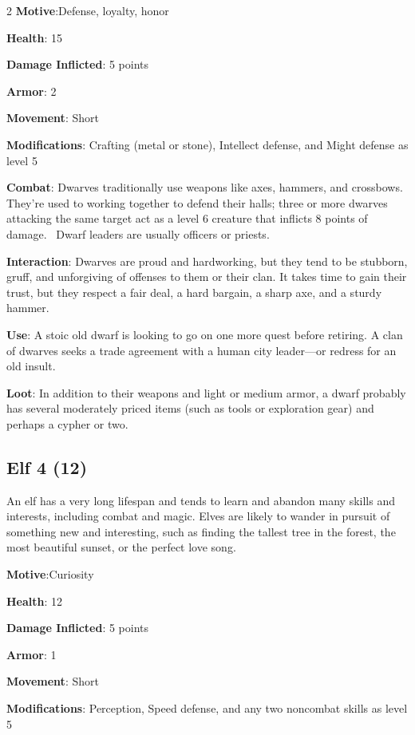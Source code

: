 \begin{multicols}{2}
\textbf{Motive}:Defense, loyalty, honor 

\textbf{Health}: 15 

\textbf{Damage Inflicted}: 5 points 

\textbf{Armor}: 2 

\textbf{Movement}: Short 

\textbf{Modifications}: Crafting (metal or stone), Intellect defense, and Might defense as level 5 

\textbf{Combat}: Dwarves traditionally use weapons like axes, hammers, and crossbows. They’re used to working together to defend their halls; three or more dwarves attacking the same target act as a level 6 creature that inflicts 8 points of damage. 
Dwarf leaders are usually officers or priests.

\textbf{Interaction}: Dwarves are proud and hardworking, but they tend to be stubborn, gruff, and unforgiving of offenses to them or their clan. It takes time to gain their trust, but they respect a fair deal, a hard bargain, a sharp axe, and a sturdy hammer. 

\textbf{Use}: A stoic old dwarf is looking to go on one more quest before retiring. A clan of dwarves seeks a trade agreement with a human city leader—or redress for an old insult.

\textbf{Loot}: In addition to their weapons and light or medium armor, a dwarf probably has several moderately priced items (such as tools or exploration gear) and perhaps a cypher or two.

\subsection{Elf 4 (12)}

An elf has a very long lifespan and tends to learn and abandon many skills and interests, including combat and magic. Elves are likely to wander in pursuit of something new and interesting, such as finding the tallest tree in the forest, the most beautiful sunset, or the perfect love song. 

\textbf{Motive}:Curiosity 

\textbf{Health}: 12 

\textbf{Damage Inflicted}: 5 points 

\textbf{Armor}: 1 

\textbf{Movement}: Short 

\textbf{Modifications}: Perception, Speed defense, and any two noncombat skills as level 5 


\end{multicols}
